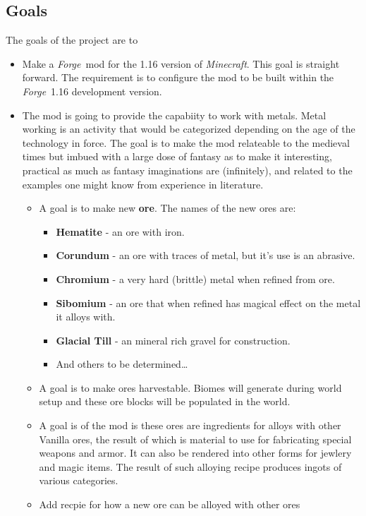 \documentclass[12pt]{memoir}
\newcommand{\minecraft}{{\textit{Minecraft}}}
\newcommand{\forge}{{\textit{Forge}}}
\begin{document}
\subsection{Goals}

The goals of the project are to

\begin{itemize}
\item Make a \forge\ mod for the 1.16 version of \minecraft. This goal 
is straight forward.  The requirement is to configure the mod to be
built within the \forge\ 1.16 development version.
\item The mod is going to provide the capabiity to work with metals. Metal
working is an activity that would be categorized depending on the age of
the technology in force.   The goal is to make the mod relateable to
the medieval times but imbued with a large dose of fantasy as to make
it interesting, practical as much as fantasy imaginations are (infinitely),
and related to the examples one might know from experience in literature.
\begin{itemize}
\item A goal is to make new {\textbf{ore}}.  The names of the new
ores are:
  \begin{itemize}
   \item {\textbf{Hematite}} - an ore with iron.
   \item {\textbf{Corundum}} - an ore with traces of metal, but it's use is an abrasive.
   \item {\textbf{Chromium}} - a very hard (brittle) metal when refined from ore.
   \item {\textbf{Sibomium}} - an ore that when refined has magical effect on the metal it alloys with.
   \item {\textbf{Glacial Till}} - an mineral rich gravel for construction.
   \item And others to be determined\ldots
  \end{itemize} 
\item A goal is to make ores harvestable.  Biomes will generate
during world setup and these ore blocks will be populated in the world.
\item A goal is of the mod is these ores are ingredients for alloys
with other Vanilla ores, the result of which is material to use for fabricating
special weapons and armor.  It can also be rendered into other
forms for jewlery and magic items.  The result of such alloying recipe 
produces ingots of various categories.
\item Add recpie for how a new ore can be alloyed with other ores

\end{itemize}
\end{itemize}
\end{document}
